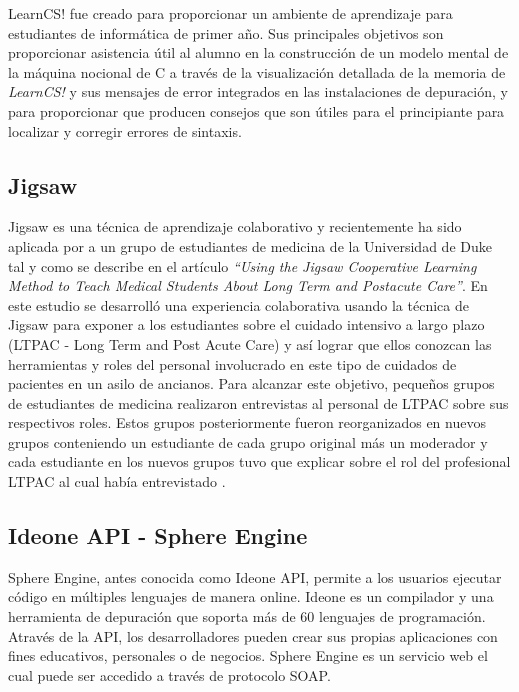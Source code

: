\documentclass[twoside]{article}
\begin{document}
\begin{multicols}{2}
LearnCS! fue creado para proporcionar un ambiente de aprendizaje para estudiantes de informática de primer año. Sus principales objetivos son proporcionar asistencia útil al alumno en la construcción de un modelo mental de la máquina nocional de C a través de la visualización detallada de la memoria de \emph{LearnCS!} y sus mensajes de error integrados en las instalaciones de depuración, y para proporcionar que producen consejos que son útiles para el principiante para localizar y corregir errores de sintaxis\cite{lipman_learncs_2014}.\\

\subsection*{Jigsaw}
Jigsaw es una técnica de aprendizaje colaborativo y recientemente ha sido aplicada por  a un grupo de estudiantes de medicina  de la Universidad de Duke tal y como se describe en el artículo \emph{``Using the Jigsaw Cooperative Learning Method to Teach Medical Students About Long Term and Postacute Care''}. En este estudio se desarrolló una experiencia colaborativa usando la técnica de Jigsaw para exponer a los estudiantes sobre el cuidado intensivo a largo plazo  (LTPAC - Long Term and Post Acute Care) y así lograr que ellos conozcan las herramientas y roles del personal involucrado en este tipo de cuidados de pacientes en un asilo de ancianos. Para alcanzar este objetivo, pequeños grupos de estudiantes de medicina realizaron entrevistas al personal de LTPAC sobre sus respectivos roles. Estos grupos posteriormente fueron reorganizados en nuevos grupos conteniendo un estudiante de cada grupo original más un moderador y cada estudiante en los nuevos grupos tuvo que explicar sobre el rol del profesional LTPAC al cual había entrevistado \cite{Buhr2014429}.\\

\subsection*{Ideone API - Sphere Engine}
Sphere Engine, antes conocida como Ideone API, permite a los usuarios ejecutar código en múltiples lenguajes de manera online. Ideone es un compilador y una herramienta de depuración que soporta más de 60 lenguajes de programación. Através de la API, los desarrolladores pueden crear sus propias aplicaciones con fines educativos, personales o de negocios. Sphere Engine es un servicio web el cual puede ser accedido a través de protocolo SOAP.\\


\end{multicols}
\end{document}
